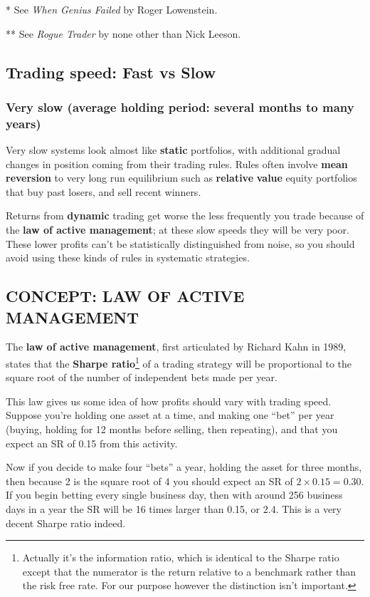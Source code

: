\noindent ** See \textit{When Genius Failed} by Roger Lowenstein.

\noindent *** See \textit{Rogue Trader} by none other than Nick Leeson.

\subsection*{Trading speed: Fast vs Slow}

\subsubsection*{Very slow (average holding period: several months to many years)}

Very slow systems look almost like \textbf{static} portfolios, with additional gradual changes in position coming from their trading rules. Rules often involve \textbf{mean reversion} to very long run equilibrium such as \textbf{relative} \textbf{value} equity portfolios that buy past losers, and sell recent winners.

Returns from \textbf{dynamic} trading get worse the less frequently you trade because of the \textbf{law of active management}; at these slow speeds they will be very poor. These lower profits can't be statistically distinguished from noise, so you should avoid using these kinds of rules in systematic strategies.

\subsection*{CONCEPT: LAW OF ACTIVE MANAGEMENT}

The \textbf{law of active management}, first articulated by Richard Kahn in 1989, states that the \textbf{Sharpe ratio}\footnote{Actually it's the information ratio, which is identical to the Sharpe ratio except that the numerator is the return relative to a benchmark rather than the risk free rate. For our purpose however the distinction isn't important.} of a trading strategy will be proportional to the square root of the number of independent bets made per year.

This law gives us some idea of how profits should vary with trading speed. Suppose you're holding one asset at a time, and making one ``bet'' per year (buying, holding for 12 months before selling, then repeating), and that you expect an SR of 0.15 from this activity.

Now if you decide to make four ``bets'' a year, holding the asset for three months, then because 2 is the square root of 4 you should expect an SR of $2 \times 0.15 = 0.30$. If you begin betting every single business day, then with around 256 business days in a year the SR will be 16 times larger than 0.15, or 2.4. This is a very decent Sharpe ratio indeed.

